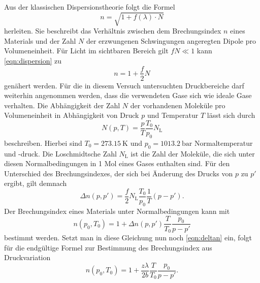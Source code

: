 Aus der klassischen Dispersionstheorie folgt die Formel
\begin{equation}
    n = \sqrt{1 + f(\lambda) \cdot N}
    \label{eqn:dispersion}
\end{equation}
herleiten. Sie beschreibt das Verhältnis zwischen dem Brechungsindex $n$ eines Materials und der Zahl $N$ der erzwungenen 
Schwingungen angeregten Dipole pro Volumeneinheit. Für Licht im sichtbaren Bereich gilt $fN \ll 1$ kann \autoref{eqn:dispersion}
zu 
\begin{equation}
    n = 1 + \frac{f}{2} N
\end{equation}
genähert werden. Für die in diesem Versuch untersuchten Druckbereiche darf weiterhin angenommen werden, dass die verwendeten Gase 
sich wie ideale Gase verhalten. Die Abhängigkeit der Zahl $N$ der vorhandenen Moleküle pro Volumeneinheit in Abhängigkeit von Druck $p$ und 
Temperatur $T$ lässt sich durch
\begin{equation}
    N(p,T) = \frac{p}{T} \frac{T_0}{p_0} N_\text{L}
\end{equation}
beschreiben. Hierbei sind $T_0 = \SI{273,15}{\kelvin}$ und $p_0 = \SI{1013,2}{\bar}$ Normaltemperatur und -druck. 
Die Loschmidtsche Zahl $N_\text{L}$ ist die Zahl der Moleküle, die sich unter diesen Normalbedingungen in 1 Mol eines
Gases enthalten sind. 
Für den Unterschied des Brechungsindexes, der sich bei Änderung des Drucks von $p$ zu $p'$ ergibt, gilt demnach
\begin{equation}
    \Delta n(p,p') = \frac{f}{2} N_\text{L} \frac{T_0}{p_0} \frac{1}{T} (p-p') .
\end{equation}
Der Brechungsindex eines Materials unter Normalbedingungen kann mit
\begin{equation}
    n(p_0,T_0) = 1 + \Delta n (p,p') \frac{T}{T_0} \frac{p_0}{p-p'}
\end{equation}
bestimmt werden. Setzt man in diese Gleichung nun noch \autoref{eqn:deltan} ein, folgt für die endgültige Formel zur Bestimmung des
Brechungsindex aus Druckvariation
\begin{equation}
    n(p_0, T_0) = 1 + \frac{z\lambda}{2b} \frac{T}{T_0} \frac{p_0}{p-p'} .
\end{equation}


\cite{sample}

